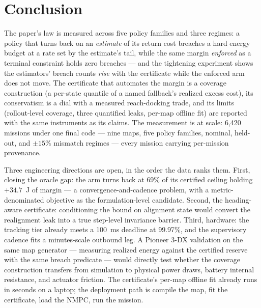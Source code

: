 \documentclass[preprint,12pt]{elsarticle}
\begin{document}
\section{Conclusion}
\label{sec:conclusion}

The paper's law is measured across five policy families and three
regimes: a policy that turns back on an \emph{estimate} of its return
cost breaches a hard energy budget at a rate set by the estimate's
tail, while the same margin \emph{enforced} as a terminal constraint
holds zero breaches --- and the tightening experiment shows the
estimators' breach counts \emph{rise} with the certificate while the
enforced arm does not move. The certificate that automates the
margin is a coverage construction (a per-state quantile of a named
fallback's realized excess cost), its conservatism is a dial with a
measured reach-docking trade, and its limits (rollout-level coverage,
three quantified leaks, per-map offline fit) are reported with the
same instruments as its claims. The measurement is at scale:
6{,}420 missions under one final code --- nine maps, five policy
families, nominal, held-out, and $\pm 15\%$ mismatch regimes --- every
mission carrying per-mission provenance.


Three engineering directions are open, in the order the data ranks
them. First, closing the oracle gap: the arm turns back at $69\%$ of
its certified ceiling holding $+34.7$~J of margin --- a
convergence-and-cadence problem, with a metric-denominated objective
as the formulation-level candidate. Second, the heading-aware
certificate: conditioning the bound on alignment state would convert
the realignment leak into a true step-level invariance barrier.
Third, hardware: the tracking tier already meets a 100~ms deadline at
99.97\%, and the supervisory cadence fits a minutes-scale outbound
leg. A Pioneer 3-DX validation on the same map generator ---
measuring realized energy against the certified reserve with the
same breach predicate --- would directly test whether the
coverage construction transfers from simulation to physical
power draws, battery internal resistance, and actuator friction.
The certificate's per-map offline fit already runs in seconds
on a laptop; the deployment path is compile the map, fit the
certificate, load the NMPC, run the mission.

\end{document}
